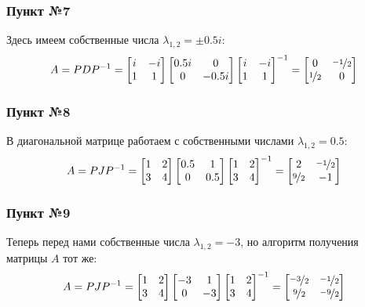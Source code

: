 \documentclass[a3paper,14pt]{extarticle}
\begin{document}
\subsubsection*{Пункт №7}
Здесь имеем собственные числа $\lambda_{1,2}= \pm0.5i$:
$$A = PDP^{-1} = \begin{bmatrix}
    i & -i \\ 1 & 1
\end{bmatrix}\begin{bmatrix}
    0.5i & 0 \\ 0 & -0.5i
\end{bmatrix}\begin{bmatrix}
    i & -i \\ 1 & 1
\end{bmatrix}^{-1} = \begin{bmatrix}
    0 & \nicefrac{-1}{2} \\ \nicefrac{1}{2} & 0
\end{bmatrix}$$
\subsubsection*{Пункт №8}
В диагональной матрице работаем с собственными числами $\lambda_{1,2}= 0.5$:
$$A = PJP^{-1} = \begin{bmatrix}
    1 & 2 \\ 3 & 4
\end{bmatrix}\begin{bmatrix}
    0.5 & 1 \\ 0 & 0.5
\end{bmatrix}\begin{bmatrix}
    1 & 2 \\ 3 & 4
\end{bmatrix}^{-1} = \begin{bmatrix}
    2 & \nicefrac{-1}{2} \\
    \nicefrac{9}{2} & -1
\end{bmatrix}$$
\subsubsection*{Пункт №9}
Теперь перед нами собственные числа $\lambda_{1,2} = -3$, но алгоритм получения матрицы $A$ тот же:
$$A = PJP^{-1} = \begin{bmatrix}
    1 & 2 \\ 3 & 4
\end{bmatrix}\begin{bmatrix}
    -3 & 1 \\ 0 & -3
\end{bmatrix}\begin{bmatrix}
    1 & 2 \\ 3 & 4
\end{bmatrix}^{-1} = \begin{bmatrix}
    \nicefrac{-3}{2} & \nicefrac{-1}{2} \\
    \nicefrac{9}{2} & \nicefrac{-9}{2}
\end{bmatrix}$$
\end{document}

